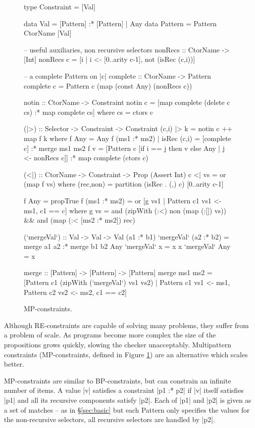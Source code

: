 \documentclass[preprint]{sigplanconf}
\newcommand{\C}[1]{\textsf{#1}}
\begin{document}
\begin{figure}
\begin{code}
type Constraint = [Val]

data Val      =  [Pattern] :* [Pattern]
              |  Any
data Pattern  =  Pattern CtorName [Val]

-- useful auxiliaries, non recursive selectors
nonRecs :: CtorName -> [Int]
nonRecs c = [i | i <- [0..arity c-1], not (isRec (c,i))]

-- a complete Pattern on |c|
complete :: CtorName -> Pattern
complete c = Pattern c (map (const Any) (nonRecs c))

notin :: CtorName -> Constraint
notin c = [map complete (delete c cs) :* map complete cs]
    where cs = ctors c

(|>) :: Selector -> Constraint -> Constraint
(c,i) |> k = notin c ++ map f k
    where
    f Any = Any
    f (ms1 :* ms2) | isRec (c,i) = [complete c] :* merge ms1 ms2
    f v =  [Pattern c [if i == j then v else Any | j <- nonRecs c]]
           :* map complete (ctors c)

(<|) :: CtorName -> Constraint -> Prop (Assert Int)
c <| vs = or (map f vs)
    where
    (rec,non) = partition (isRec . (,) c) [0..arity c-1]

    f Any = propTrue
    f (ms1 :* ms2) = or [g vs1 | Pattern c1 vs1 <- ms1, c1 == c]
        where g vs =  and (zipWith (:<) non (map (:[]) vs)) &&
                      and (map (:< [ms2 :* ms2]) rec)

(`mergeVal`) :: Val -> Val -> Val
(a1 :* b1) `mergeVal` (a2 :* b2)  = merge a1 a2 :* merge b1 b2
Any        `mergeVal` x           = x
x          `mergeVal` Any         = x

merge :: [Pattern] -> [Pattern] -> [Pattern]
merge  ms1 ms2 = [Pattern c1 (zipWith (`mergeVal`) vs1 vs2) |
       Pattern c1 vs1 <- ms1, Pattern c2 vs2 <- ms2, c1 == c2]
\end{code}
\caption{MP-constraints.}
\label{fig:enumeration}
\end{figure}

Although RE-constraints are capable of solving many problems, they suffer from a problem of scale. As programs become more complex the size of the propositions grows quickly, slowing the checker unacceptably. Multipattern constraints (MP-constraints, defined in Figure \ref{fig:enumeration}) are an alternative which scales better.

MP-constraints are similar to BP-constraints, but can constrain an infinite number of items. A value |v| satisfies a constraint |p1 :* p2| if |v| itself satisfies |p1| and all its recursive components satisfy |p2|. Each of |p1| and |p2| is given as a set of matches -- as in \S\ref{sec:basic} but each \C{Pattern} only specifies the values for the non-recursive selectors, all recursive selectors are handled by |p2|.
\end{document}
